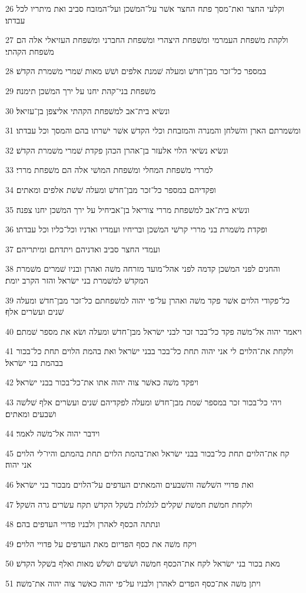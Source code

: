 \par 26 וקלעי החצר ואת־מסך פתח החצר אשׁר על־המשׁכן ועל־המזבח סביב ואת מיתריו לכל עבדתו׃
\par 27 ולקהת משׁפחת העמרמי ומשׁפחת היצהרי ומשׁפחת החברני ומשׁפחת העזיאלי אלה הם משׁפחת הקהתי׃
\par 28 במספר כל־זכר מבן־חדשׁ ומעלה שׁמנת אלפים ושׁשׁ מאות שׁמרי משׁמרת הקדשׁ׃
\par 29 משׁפחת בני־קהת יחנו על ירך המשׁכן תימנה׃
\par 30 ונשׂיא בית־אב למשׁפחת הקהתי אליצפן בן־עזיאל׃
\par 31 ומשׁמרתם הארן והשׁלחן והמנרה והמזבחת וכלי הקדשׁ אשׁר ישׁרתו בהם והמסך וכל עבדתו׃
\par 32 ונשׂיא נשׂיאי הלוי אלעזר בן־אהרן הכהן פקדת שׁמרי משׁמרת הקדשׁ׃
\par 33 למררי משׁפחת המחלי ומשׁפחת המושׁי אלה הם משׁפחת מררי׃
\par 34 ופקדיהם במספר כל־זכר מבן־חדשׁ ומעלה שׁשׁת אלפים ומאתים׃
\par 35 ונשׂיא בית־אב למשׁפחת מררי צוריאל בן־אביחיל על ירך המשׁכן יחנו צפנה׃
\par 36 ופקדת משׁמרת בני מררי קרשׁי המשׁכן ובריחיו ועמדיו ואדניו וכל־כליו וכל עבדתו׃
\par 37 ועמדי החצר סביב ואדניהם ויתדתם ומיתריהם׃
\par 38 והחנים לפני המשׁכן קדמה לפני אהל־מועד מזרחה משׁה ואהרן ובניו שׁמרים משׁמרת המקדשׁ למשׁמרת בני ישׂראל והזר הקרב יומת׃
\par 39 כל־פקודי הלוים אשׁר פקד משׁה ואהרן על־פי יהוה למשׁפחתם כל־זכר מבן־חדשׁ ומעלה שׁנים ועשׂרים אלף׃
\par 40 ויאמר יהוה אל־משׁה פקד כל־בכר זכר לבני ישׂראל מבן־חדשׁ ומעלה ושׂא את מספר שׁמתם׃
\par 41 ולקחת את־הלוים לי אני יהוה תחת כל־בכר בבני ישׂראל ואת בהמת הלוים תחת כל־בכור בבהמת בני ישׂראל׃
\par 42 ויפקד משׁה כאשׁר צוה יהוה אתו את־כל־בכור בבני ישׂראל׃
\par 43 ויהי כל־בכור זכר במספר שׁמת מבן־חדשׁ ומעלה לפקדיהם שׁנים ועשׂרים אלף שׁלשׁה ושׁבעים ומאתים׃
\par 44 וידבר יהוה אל־משׁה לאמר׃
\par 45 קח את־הלוים תחת כל־בכור בבני ישׂראל ואת־בהמת הלוים תחת בהמתם והיו־לי הלוים אני יהוה׃
\par 46 ואת פדויי השׁלשׁה והשׁבעים והמאתים העדפים על־הלוים מבכור בני ישׂראל׃
\par 47 ולקחת חמשׁת חמשׁת שׁקלים לגלגלת בשׁקל הקדשׁ תקח עשׂרים גרה השׁקל׃
\par 48 ונתתה הכסף לאהרן ולבניו פדויי העדפים בהם׃
\par 49 ויקח משׁה את כסף הפדיום מאת העדפים על פדויי הלוים׃
\par 50 מאת בכור בני ישׂראל לקח את־הכסף חמשׁה ושׁשׁים ושׁלשׁ מאות ואלף בשׁקל הקדשׁ׃
\par 51 ויתן משׁה את־כסף הפדים לאהרן ולבניו על־פי יהוה כאשׁר צוה יהוה את־משׁה׃

